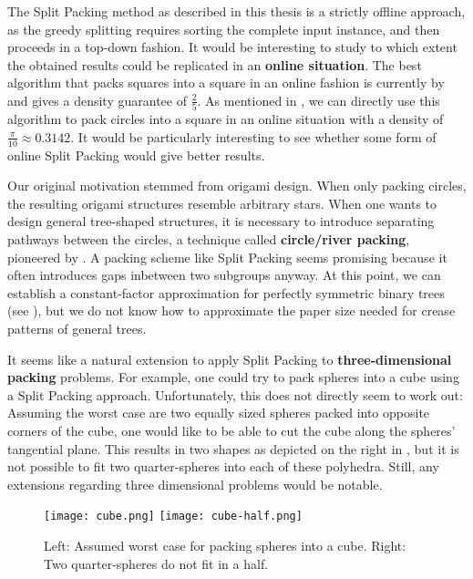 \documentclass[a4paper,style=print,bibliography=totoc,nexus,lnum,extramargin]{tubsbook}
\begin{document}
The Split Packing method as described in this thesis is a strictly offline approach, as the greedy splitting requires sorting the complete input instance, and then proceeds in a top-down fashion. It would be interesting to study to which extent the obtained results could be replicated in an \textbf{online situation}. The best algorithm that packs squares into a square in an online fashion is currently by \textcite{brubach2014improved} and gives a density guarantee of $\frac{2}{5}$. As mentioned in , we can directly use this algorithm to pack circles into a square in an online situation with a density of $\frac{\pi}{10} \approx 0.3142$. It would be particularly interesting to see whether some form of online Split Packing would give better results.

Our original motivation stemmed from origami design. When only packing circles, the resulting origami structures resemble arbitrary stars. When one wants to design general tree-shaped structures, it is necessary to introduce separating pathways between the circles, a technique called \textbf{circle/river packing}, pioneered by \textcite{lang1996computational}.
A packing scheme like Split Packing seems promising because it often introduces gaps inbetween two subgroups anyway. At this point, we can establish a constant-factor approximation for perfectly symmetric binary trees (see ), but we do not know how to approximate the paper size needed for crease patterns of general trees.


It seems like a natural extension to apply Split Packing to \textbf{three-dimensional packing} problems. For example, one could try to pack spheres into a cube using a Split Packing approach. Unfortunately, this does not directly seem to work out: Assuming the worst case are two equally sized spheres packed into opposite corners of the cube, one would like to be able to cut the cube along the spheres' tangential plane. This results in two shapes as depicted on the right in , but it is not possible to fit two quarter-spheres into each of these polyhedra. Still, any extensions regarding three dimensional problems would be notable.

\begin{figure}
    \texttt{[image: cube.png]}
    \texttt{[image: cube-half.png]}
    \caption{Left: Assumed worst case for packing spheres into a cube. Right: Two quarter-spheres do not fit in a half.}\label{fig:cube-half}
\end{figure}
\end{document}
